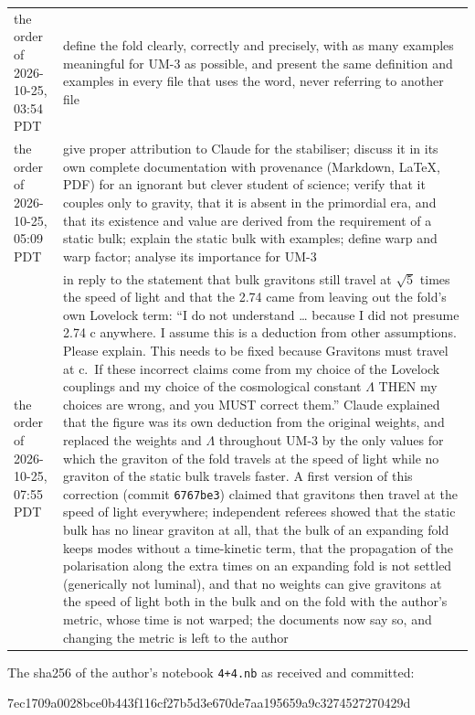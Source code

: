 \documentclass[
  10pt,
]{article}
\newenvironment{Shaded}{}{}
\newcommand{\NormalTok}[1]{#1}
\begin{document}
\begin{longtable}[]{@{}
  >{\raggedright\arraybackslash}p{}
  >{\raggedright\arraybackslash}p{}@{}}
the order of 2026-10-25, 03:54 PDT & define the fold clearly, correctly
and precisely, with as many examples meaningful for UM-3 as possible,
and present the same definition and examples in every file that uses the
word, never referring to another file \\
the order of 2026-10-25, 05:09 PDT & give proper attribution to Claude
for the stabiliser; discuss it in its own complete documentation with
provenance (Markdown, LaTeX, PDF) for an ignorant but clever student of
science; verify that it couples only to gravity, that it is absent in
the primordial era, and that its existence and value are derived from
the requirement of a static bulk; explain the static bulk with examples;
define warp and warp factor; analyse its importance for UM-3 \\
the order of 2026-10-25, 07:55 PDT & in reply to the statement that bulk
gravitons still travel at \(\sqrt5\) times the speed of light and that
the 2.74 came from leaving out the fold's own Lovelock term: ``I do not
understand \ldots{} because I did not presume 2.74 c anywhere. I assume
this is a deduction from other assumptions. Please explain. This needs
to be fixed because Gravitons must travel at c.~If these incorrect
claims come from my choice of the Lovelock couplings and my choice of
the cosmological constant \(\Lambda\) THEN my choices are wrong, and you
MUST correct them.'' Claude explained that the figure was its own
deduction from the original weights, and replaced the weights and
\(\Lambda\) throughout UM-3 by the only values for which the graviton of
the fold travels at the speed of light while no graviton of the static
bulk travels faster. A first version of this correction (commit
\texttt{6767be3}) claimed that gravitons then travel at the speed of
light everywhere; independent referees showed that the static bulk has
no linear graviton at all, that the bulk of an expanding fold keeps
modes without a time-kinetic term, that the propagation of the
polarisation along the extra times on an expanding fold is not settled
(generically not luminal), and that no weights can give gravitons at the
speed of light both in the bulk and on the fold with the author's
metric, whose time is not warped; the documents now say so, and changing
the metric is left to the author \\
\end{longtable}

The sha256 of the author's notebook \texttt{4+4.nb} as received and
committed:

\begin{Shaded}
\begin{Highlighting}[]
\NormalTok{7ec1709a0028bce0b443f116cf27b5d3e670de7aa195659a9c3274527270429d}
\end{Highlighting}
\end{Shaded}
\end{document}
